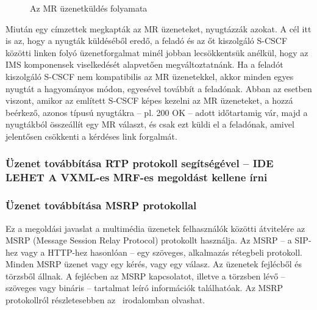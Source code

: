 \begin{figure}[htbp]
\center
{}
\caption{Az MR üzenetküldés folyamata}
\label{fig:mrflow}
\end{figure}

Miután egy címzettek megkapták az MR üzeneteket, nyugtázzák azokat. A cél itt is az, hogy a nyugták küldéséből eredő, a feladó és az őt kiszolgáló S-CSCF közötti linken folyó üzenetforgalmat minél jobban lecsökkentsük anélkül, hogy az IMS komponensek viselkedését alapvetően megváltoztatnánk. Ha a feladót kiszolgáló S-CSCF nem kompatibilis az MR üzenetekkel, akkor minden egyes nyugtát a hagyományos módon, egyesével továbbít a feladónak. Abban az esetben viszont, amikor az említett S-CSCF képes kezelni az MR üzeneteket, a hozzá beérkező, azonos típusú nyugtákra -- pl. 200 OK -- adott időtartamig vár, majd a nyugtákból összeállít egy MR választ, és csak ezt küldi el a feladónak, amivel jelentősen csökkenti a kérdéses link forgalmát.

\subsubsection{Üzenet továbbítása RTP protokoll segítségével -- {\color{red}IDE LEHET A VXML-es MRF-es megoldást kellene írni}}



\subsubsection{Üzenet továbbítása MSRP protokollal}

Ez a megoldási javaslat a multimédia üzenetek felhasználók közötti átvitelére az MSRP (Message Session Relay Protocol) protokollt használja. Az MSRP -- a SIP-hez vagy a HTTP-hez hasonlóan -- egy szöveges, alkalmazás rétegbeli protokoll. Minden MSRP üzenet vagy egy kérés, vagy egy válasz. Az üzenetek fejlécből és törzsből állnak. A fejlécben az MSRP kapcsolatot, illetve a törzsben lévő -- szöveges vagy bináris -- tartalmat leíró információk találhatóak. Az MSRP protokollról részletesebben az~\cite{rfc4975} irodalomban olvashat.

